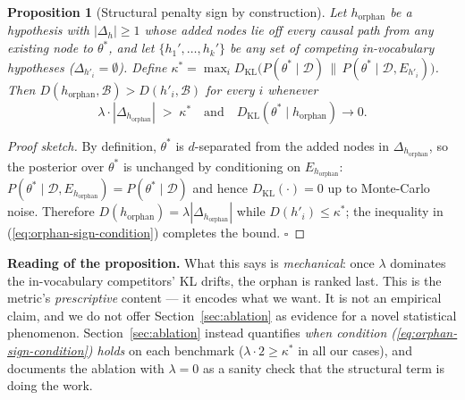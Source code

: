\documentclass{article}
\newtheorem{proposition}{Proposition}
\begin{document}
\begin{proposition}[Structural penalty sign by construction]
\label{prop:orphan-by-construction}
Let $h_{\mathrm{orphan}}$ be a hypothesis with $|\Delta_{h}| \geq 1$
whose added nodes lie off every causal path from any existing node to
$\theta^{*}$, and let $\{h_{1}', \ldots, h_{k}'\}$ be any set of
competing in-vocabulary hypotheses ($\Delta_{h'_{i}} = \emptyset$).
Define
$\kappa^{*} = \max_{i} D_{\mathrm{KL}}\big(P(\theta^{*} \mid \mathcal{D}) \,\|\,
P(\theta^{*} \mid \mathcal{D}, E_{h'_{i}})\big)$.
Then $D(h_{\mathrm{orphan}}, \mathcal{B}) > D(h'_{i}, \mathcal{B})$
for every $i$ whenever
\begin{equation}
\lambda \cdot |\Delta_{h_{\mathrm{orphan}}}| \;>\; \kappa^{*}
\quad\text{and}\quad
D_{\mathrm{KL}}(\theta^{*} \mid h_{\mathrm{orphan}}) \to 0.
\label{eq:orphan-sign-condition}
\end{equation}
\end{proposition}

\begin{proof}[Proof sketch]
By definition, $\theta^{*}$ is $d$-separated from the added nodes in
$\Delta_{h_{\mathrm{orphan}}}$, so the posterior over $\theta^{*}$ is
unchanged by conditioning on $E_{h_{\mathrm{orphan}}}$:
$P(\theta^{*} \mid \mathcal{D}, E_{h_{\mathrm{orphan}}}) =
P(\theta^{*} \mid \mathcal{D})$ and hence
$D_{\mathrm{KL}}(\cdot) = 0$ up to Monte-Carlo noise. Therefore
$D(h_{\mathrm{orphan}}) = \lambda |\Delta_{h_{\mathrm{orphan}}}|$
while $D(h'_{i}) \leq \kappa^{*}$; the inequality in
(\ref{eq:orphan-sign-condition}) completes the bound. $\square$
\end{proof}

\textbf{Reading of the proposition.} What this says is
\emph{mechanical}: once $\lambda$ dominates the in-vocabulary
competitors' KL drifts, the orphan is ranked last. This is the
metric's \emph{prescriptive} content --- it encodes what we want. It
is not an empirical claim, and we do not offer Section~\ref{sec:ablation}
as evidence for a novel statistical phenomenon. Section~\ref{sec:ablation}
instead quantifies \emph{when condition (\ref{eq:orphan-sign-condition})
holds} on each benchmark ($\lambda \cdot 2 \geq \kappa^{*}$ in all our
cases), and documents the ablation with
$\lambda = 0$ as a sanity check that the structural term is doing the
work.
\end{document}
